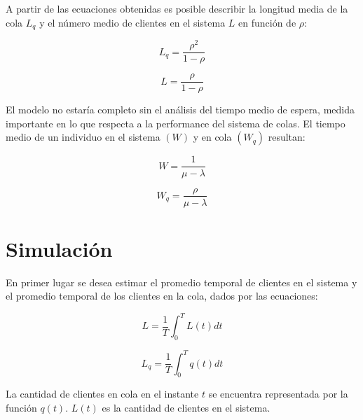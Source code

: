 \documentclass{sig-alternate}
\begin{document}
A partir de las ecuaciones obtenidas es posible describir la longitud media
de la cola $L_{q}$ y el n\'{u}mero medio de clientes en el sistema $L$ en 
funci\'{o}n de $\rho$:

\begin{equation}
\label{longitud_media_en_la_cola}
L_{q} = \frac{\rho^{2}}{1-\rho}
\end{equation}

\begin{equation}
\label{numero_medio_clientes_en_el_sistema}
L = \frac{\rho}{1-\rho}
\end{equation}


El modelo no estar\'{i}a completo sin el an\'{a}lisis del tiempo medio de 
espera, medida importante en lo que respecta a la performance del sistema
de colas. El tiempo medio de un individuo en el sistema $(W)$ y en cola $(W_{q})$
resultan:

\begin{equation}
\label{tiempo_medio_en_el_sistema}
W = \frac{1}{\mu - \lambda}
\end{equation}

\begin{equation}
\label{tiempo_medio_en_la_cola}
W_{q} = \frac{\rho}{\mu - \lambda}
\end{equation}


\section{Simulaci\'{o}n}\label{simulacion}

En primer lugar se desea estimar el promedio temporal de clientes en el sistema
y el promedio temporal de los clientes en la cola, dados por las ecuaciones:

\begin{equation}
\label{estimo_promedio_temporal_clientes_sistema}
L = \frac{1}{T} \int_{0}^{T} L(t) dt
\end{equation}

\begin{equation}
\label{estimo_promedio_temporal_clientes_cola}
L_{q} = \frac{1}{T} \int_{0}^{T} q(t) dt
\end{equation}

La cantidad de clientes en cola en el instante $t$ se encuentra representada por
la funci\'{o}n $q(t)$. $L(t)$ es la cantidad de clientes en el sistema.
\end{document}
